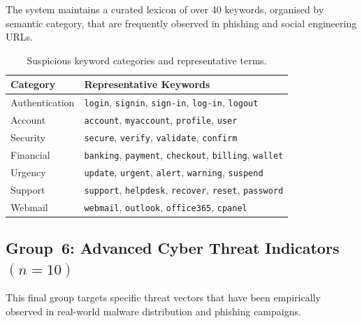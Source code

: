 \documentclass[a4paper,12pt]{article}
\begin{document}
The system maintains a curated lexicon of over 40 keywords, organised by semantic category, that are frequently observed in phishing and social engineering URLs.

\begin{table}[H]
\centering
\caption{Suspicious keyword categories and representative terms.}
\label{tab:keywords}
\begin{tabular}{ll}
\toprule
\textbf{Category} & \textbf{Representative Keywords} \\
\midrule
Authentication & \texttt{login}, \texttt{signin}, \texttt{sign-in}, \texttt{log-in}, \texttt{logout} \\
Account        & \texttt{account}, \texttt{myaccount}, \texttt{profile}, \texttt{user} \\
Security       & \texttt{secure}, \texttt{verify}, \texttt{validate}, \texttt{confirm} \\
Financial      & \texttt{banking}, \texttt{payment}, \texttt{checkout}, \texttt{billing}, \texttt{wallet} \\
Urgency        & \texttt{update}, \texttt{urgent}, \texttt{alert}, \texttt{warning}, \texttt{suspend} \\
Support        & \texttt{support}, \texttt{helpdesk}, \texttt{recover}, \texttt{reset}, \texttt{password} \\
Webmail        & \texttt{webmail}, \texttt{outlook}, \texttt{office365}, \texttt{cpanel} \\
\bottomrule
\end{tabular}
\end{table}

\subsection{Group~6: Advanced Cyber Threat Indicators \texorpdfstring{$(n=10)$}{(n=10)}}
\label{sec:feat_advanced}

This final group targets specific threat vectors that have been empirically observed in real-world malware distribution and phishing campaigns.
\end{document}
